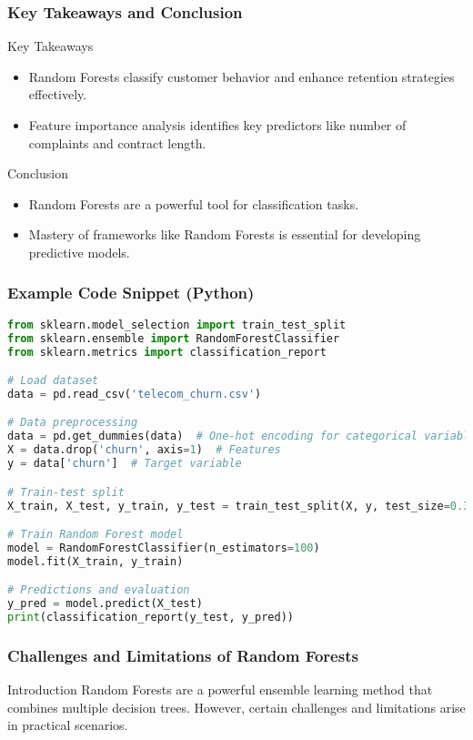 \documentclass[aspectratio=169]{beamer}
\begin{document}
\begin{frame}
    \frametitle{Key Takeaways and Conclusion}
    \begin{block}{Key Takeaways}
        \begin{itemize}
            \item Random Forests classify customer behavior and enhance retention strategies effectively.
            \item Feature importance analysis identifies key predictors like number of complaints and contract length.
        \end{itemize}
    \end{block}
    \begin{block}{Conclusion}
        \begin{itemize}
            \item Random Forests are a powerful tool for classification tasks.
            \item Mastery of frameworks like Random Forests is essential for developing predictive models.
        \end{itemize}
    \end{block}
\end{frame}

\begin{frame}[fragile]
    \frametitle{Example Code Snippet (Python)}
    \begin{lstlisting}[language=Python]
from sklearn.model_selection import train_test_split
from sklearn.ensemble import RandomForestClassifier
from sklearn.metrics import classification_report

# Load dataset
data = pd.read_csv('telecom_churn.csv')

# Data preprocessing
data = pd.get_dummies(data)  # One-hot encoding for categorical variables
X = data.drop('churn', axis=1)  # Features
y = data['churn']  # Target variable

# Train-test split
X_train, X_test, y_train, y_test = train_test_split(X, y, test_size=0.3, random_state=42)

# Train Random Forest model
model = RandomForestClassifier(n_estimators=100)
model.fit(X_train, y_train)

# Predictions and evaluation
y_pred = model.predict(X_test)
print(classification_report(y_test, y_pred))
    \end{lstlisting}
\end{frame}

\begin{frame}[fragile]
    \frametitle{Challenges and Limitations of Random Forests}
    \begin{block}{Introduction}
        Random Forests are a powerful ensemble learning method that combines multiple decision trees. However, certain challenges and limitations arise in practical scenarios.
    \end{block}
\end{frame}
\end{document}
